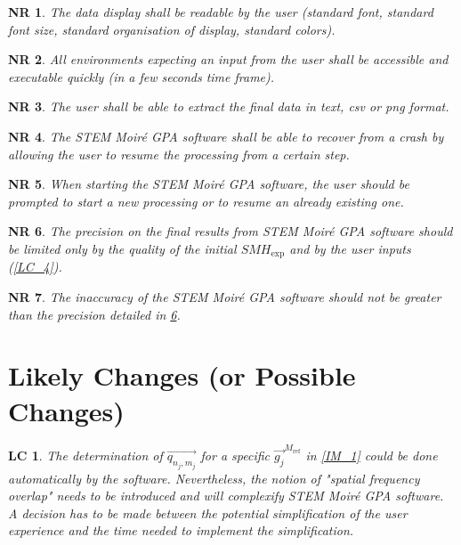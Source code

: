 \documentclass[12pt]{article}
\newcommand{\progname}{STEM Moir{\'e} GPA}
\newtheorem{NR}{NR}
\newtheorem{LC}{LC}
\begin{document}
\begin{NR}
\label{NR_3} 
\normalfont The data display shall be readable by the user (standard font, 
standard font size, standard organisation of display, standard colors).
\end{NR}

\begin{NR}
\label{NR_4} 
\normalfont All environments expecting an input from the user shall be 
accessible and executable quickly (in a few seconds time frame).
\end{NR}

\begin{NR}
\label{NR_5} 
\normalfont The user shall be able to extract the final data in text, csv or png 
format.
\end{NR}

\begin{NR}
\label{NR_6} 
\normalfont The \progname{} software shall be able to recover from a crash by 
allowing the user to resume the processing from a certain step.
\end{NR}

\begin{NR}
\label{NR_7} 
\normalfont When starting the \progname{} software, the user should be prompted 
to start a new processing or to resume an already existing one.
\end{NR}

\begin{NR}
\label{NR_8} 
\normalfont The precision on the final results from \progname{} software should 
be limited only by the quality of the initial $SMH_{\text{exp}}$ and by the user 
inputs (\cref{LC_4}).
\end{NR}

\begin{NR}
\label{NR_9} 
\normalfont The inaccuracy of the \progname{} software should not be greater 
than the precision detailed in \cref{NR_8}.
\end{NR}

\section{Likely Changes (or Possible Changes)}    

\begin{LC}
\label{LC_1}
\normalfont The determination of $\overrightarrow{q_{n_j,m_j}}$ for a specific 
$\overrightarrow{g_j}^{M_{\text{ref}}}$ in \cref{IM_1} could be done 
automatically by the software. Nevertheless, the notion of "spatial frequency 
overlap" needs to be introduced and will complexify \progname{} software. A 
decision has to be made between the potential simplification of the user 
experience and the time needed to implement the simplification.
\end{LC}
\end{document}
